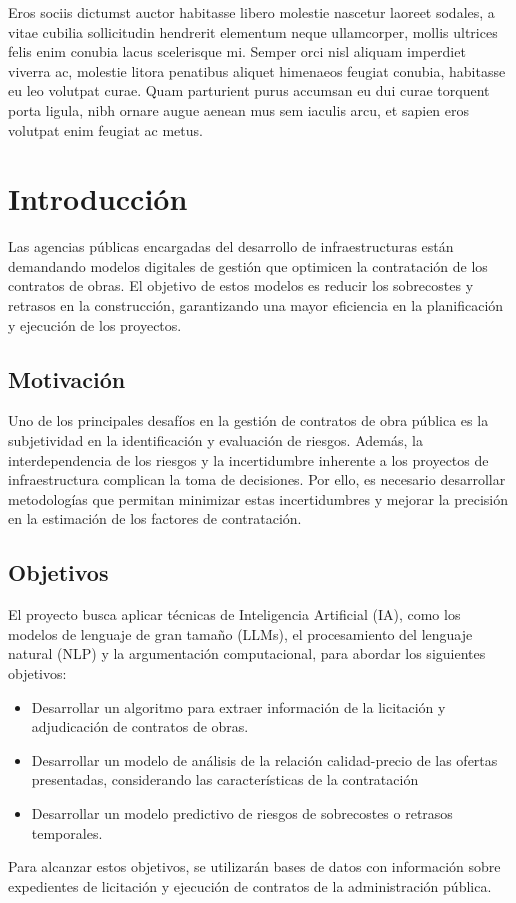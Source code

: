 \documentclass{article}
\begin{document}
Eros sociis dictumst auctor habitasse libero molestie nascetur laoreet sodales, a vitae cubilia sollicitudin hendrerit elementum neque ullamcorper, mollis ultrices felis enim conubia lacus scelerisque mi. Semper orci nisl aliquam imperdiet viverra ac, molestie litora penatibus aliquet himenaeos feugiat conubia, habitasse eu leo volutpat curae. Quam parturient purus accumsan eu dui curae torquent porta ligula, nibh ornare augue aenean mus sem iaculis arcu, et sapien eros volutpat enim feugiat ac metus.
\newpage

\section{Introducción}
Las agencias públicas encargadas del desarrollo de infraestructuras están demandando modelos digitales de gestión que optimicen la contratación de los contratos de obras. El objetivo de estos modelos es reducir los sobrecostes y retrasos en la construcción, garantizando una mayor eficiencia en la planificación y ejecución de los proyectos.


\subsection{Motivación}
Uno de los principales desafíos en la gestión de contratos de obra pública es la subjetividad en la identificación y evaluación de riesgos. Además, la interdependencia de los riesgos y la incertidumbre inherente a los proyectos de infraestructura complican la toma de decisiones. Por ello, es necesario desarrollar metodologías que permitan minimizar estas incertidumbres y mejorar la precisión en la estimación de los factores de contratación.

\subsection{Objetivos}
El proyecto busca aplicar técnicas de Inteligencia Artificial (IA), como los modelos de lenguaje de gran tamaño (LLMs), el procesamiento del lenguaje natural (NLP) y la argumentación computacional, para abordar los siguientes objetivos:
\begin{itemize}
  \item Desarrollar un algoritmo para extraer información de la licitación y adjudicación de contratos de obras.
  \item Desarrollar un modelo de análisis de la relación calidad-precio de las ofertas presentadas, considerando las características de la contratación
  \item Desarrollar un modelo predictivo de riesgos de sobrecostes o retrasos temporales.
\end{itemize}
Para alcanzar estos objetivos, se utilizarán bases de datos con información sobre expedientes de licitación y ejecución de contratos de la administración pública.
\end{document}
